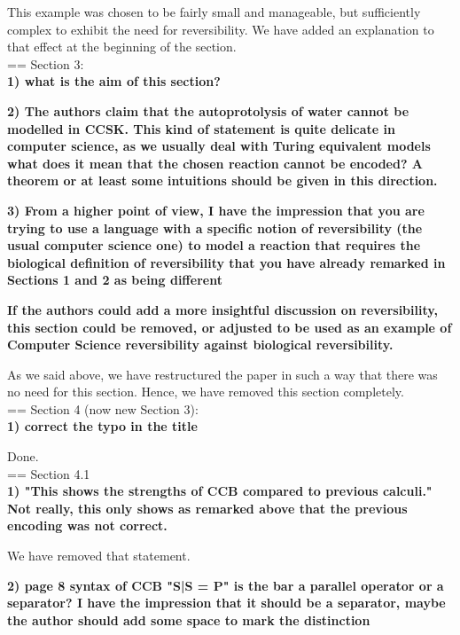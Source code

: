 \documentclass{article}
\begin{document}
This example was chosen to be fairly small and manageable, but sufficiently complex to exhibit the need for
reversibility. We have added an explanation to that effect at the beginning of the section.\\

== Section 3:\\

\textbf{1) what is the aim of this section?}

\textbf{2) The authors claim that the autoprotolysis of water cannot be modelled in CCSK.
This kind of statement is quite delicate in computer science, as we usually deal with Turing equivalent models what does it mean that the chosen reaction cannot be encoded? A theorem or at least some intuitions should be given in this direction.}

\textbf{3) From a higher point of view, I have the impression that you are trying to use a language with a specific notion of reversibility (the usual computer science one) to model a reaction that requires the biological definition of reversibility that you have already remarked in Sections 1 and 2 as being different}

\textbf{If the authors could add a more insightful discussion on reversibility, this section could be removed, or adjusted to be used as an example of Computer Science reversibility against biological reversibility.}

As we said above, we have restructured the paper in such a way that there was no need for this section.
Hence, we have removed this section completely.\\

== Section 4 (now new Section 3):\\

\textbf{1) correct the typo in the title}

Done.\\

== Section 4.1\\

\textbf{1) "This shows the strengths of CCB compared to previous calculi."
Not really, this only shows as remarked above that the previous encoding was not correct.}

We have removed that statement.

\textbf{2) page 8 syntax of CCB "S|S = P" is the bar a parallel operator or a separator? 
I have the impression that it should be a separator, maybe the author should add some space to mark the distinction}
\end{document}
